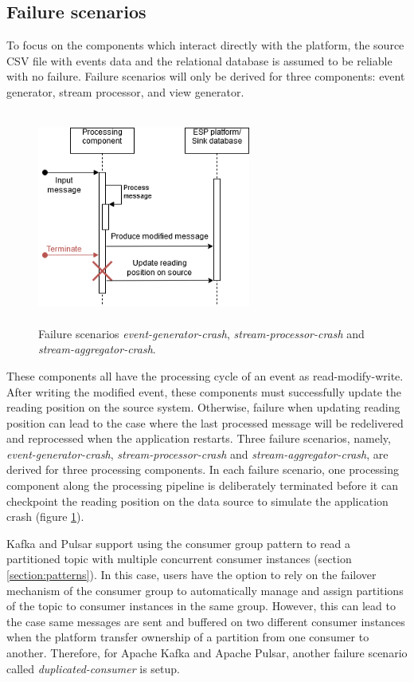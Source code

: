  
\subsection{Failure scenarios}
To focus on the components which interact directly with the platform, the source CSV file with events data and the relational database is assumed to be reliable with no failure. Failure scenarios will only be derived for three components: event generator, stream processor, and view generator.

\begin{figure}[h]
	\centering
	\includegraphics[width=7cm,height=7cm]{images/reading-position-fail.png}
	\caption{Failure scenarios \emph{event-generator-crash}, \emph{stream-processor-crash} and \emph{stream-aggregator-crash}.}
	\label{fig:scenarioreadingposition}
\end{figure}

These components all have the processing cycle of an event as read-modify-write. After writing the modified event, these components must successfully update the reading position on the source system. Otherwise, failure when updating reading position can lead to the case where the last processed message will be redelivered and reprocessed when the application restarts. Three failure scenarios, namely, \emph{event-generator-crash}, \emph{stream-processor-crash} and \emph{stream-aggregator-crash}, are derived for three processing components. In each failure scenario, one processing component along the processing pipeline is deliberately terminated before it can checkpoint the reading position on the data source to simulate the application crash (figure \ref{fig:scenarioreadingposition}).



Kafka and Pulsar support using the consumer group pattern to read a partitioned topic with multiple concurrent consumer instances (section \ref{section:patterns}). In this case, users have the option to rely on the failover mechanism of the consumer group to automatically manage and assign partitions of the topic to consumer instances in the same group. However, this can lead to the case same messages are sent and buffered on two different consumer instances when the platform transfer ownership of a partition from one consumer to another. Therefore, for Apache Kafka and Apache Pulsar, another failure scenario called \emph{duplicated-consumer} is setup.

